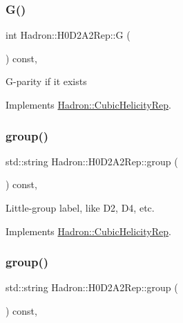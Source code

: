 \subsubsection{\texorpdfstring{G()}{G()}\hspace{0.1cm}{\footnotesize\ttfamily [3/3]}}
{\footnotesize\ttfamily int Hadron\+::\+H0\+D2\+A2\+Rep\+::G (\begin{DoxyParamCaption}{ }\end{DoxyParamCaption}) const\hspace{0.3cm}{\ttfamily [inline]}, {\ttfamily [virtual]}}

G-\/parity if it exists 

Implements \mbox{\hyperlink{structHadron_1_1CubicHelicityRep_a50689f42be1e6170aa8cf6ad0597018b}{Hadron\+::\+Cubic\+Helicity\+Rep}}.

\mbox{\label{structHadron_1_1H0D2A2Rep_a447b40e4e175693969a3510643b01f46}} 
\subsubsection{\texorpdfstring{group()}{group()}\hspace{0.1cm}{\footnotesize\ttfamily [1/5]}}
{\footnotesize\ttfamily std\+::string Hadron\+::\+H0\+D2\+A2\+Rep\+::group (\begin{DoxyParamCaption}{ }\end{DoxyParamCaption}) const\hspace{0.3cm}{\ttfamily [inline]}, {\ttfamily [virtual]}}

Little-\/group label, like D2, D4, etc. 

Implements \mbox{\hyperlink{structHadron_1_1CubicHelicityRep_a101a7d76cd8ccdad0f272db44b766113}{Hadron\+::\+Cubic\+Helicity\+Rep}}.

\mbox{\label{structHadron_1_1H0D2A2Rep_a447b40e4e175693969a3510643b01f46}} 
\subsubsection{\texorpdfstring{group()}{group()}\hspace{0.1cm}{\footnotesize\ttfamily [2/5]}}
{\footnotesize\ttfamily std\+::string Hadron\+::\+H0\+D2\+A2\+Rep\+::group (\begin{DoxyParamCaption}{ }\end{DoxyParamCaption}) const\hspace{0.3cm}{\ttfamily [inline]}, {\ttfamily [virtual]}}

